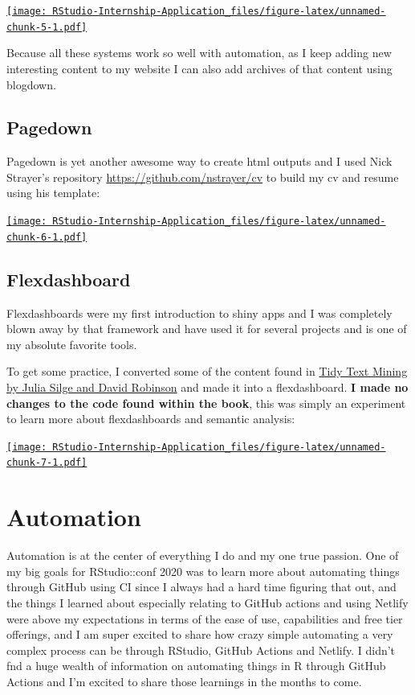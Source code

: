\documentclass[
]{book}
\begin{document}
\href{https://predictcryptoblog.com/}{\texttt{[image: RStudio-Internship-Application\_files/figure-latex/unnamed-chunk-5-1.pdf]}}

Because all these systems work so well with automation, as I keep adding new interesting content to my website I can also add archives of that content using blogdown.

\hypertarget{pagedown}{%
\subsection{Pagedown}\label{pagedown}}

Pagedown\citep{R-pagedown} is yet another awesome way to create html outputs and I used Nick Strayer's repository \url{https://github.com/nstrayer/cv} to build my cv and resume using his template:

\href{https://ricky-cv.netlify.com/resume}{\texttt{[image: RStudio-Internship-Application\_files/figure-latex/unnamed-chunk-6-1.pdf]}}

\hypertarget{flexdashboard}{%
\subsection{Flexdashboard}\label{flexdashboard}}

Flexdashboards\citep{R-flexdashboard} were my first introduction to shiny apps and I was completely blown away by that framework and have used it for several projects and is one of my absolute favorite tools.

To get some practice, I converted some of the content found in \href{https://www.tidytextmining.com/}{Tidy Text Mining by Julia Silge and David Robinson} and made it into a flexdashboard. \textbf{I made no changes to the code found within the book}, this was simply an experiment to learn more about flexdashboards and semantic analysis:

\href{https://predictcrypto.shinyapps.io/SemanticAnalysisExample/}{\texttt{[image: RStudio-Internship-Application\_files/figure-latex/unnamed-chunk-7-1.pdf]}}

\hypertarget{automation}{%
\section{Automation}\label{automation}}

Automation is at the center of everything I do and my one true passion. One of my big goals for RStudio::conf 2020 was to learn more about automating things through GitHub using CI since I always had a hard time figuring that out, and the things I learned about especially relating to GitHub actions and using Netlify were above my expectations in terms of the ease of use, capabilities and free tier offerings, and I am super excited to share how crazy simple automating a very complex process can be through RStudio, GitHub Actions and Netlify. I didn't fnd a huge wealth of information on automating things in R through GitHub Actions and I'm excited to share those learnings in the months to come.
\end{document}
